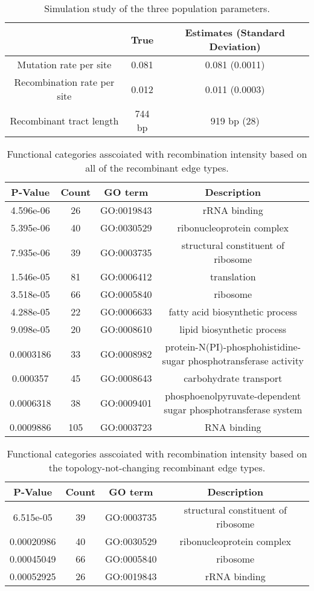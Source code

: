 \documentclass[english]{article}
\providecommand{\tabularnewline}{\\}
\begin{document}
\begin{table}
\caption{\label{tab:sim-three-population-parameters}
Simulation study of the three population parameters.}
\noindent \begin{centering}
\begin{tabular}{ccc}
 & True & Estimates (Standard Deviation)\tabularnewline
\hline
Mutation rate per site & 0.081 & 0.081 (0.0011)\tabularnewline
Recombination rate per site & 0.012 & 0.011 (0.0003)\tabularnewline
Recombinant tract length & 744 bp & 919 bp (28)\tabularnewline
\hline
\end{tabular}
\par\end{centering}
\end{table}
\clearpage{}

\begin{table}
\caption{\label{tab:functional-all}Functional categories asscoiated with 
recombination intensity based on all of the recombinant edge types.}
\begin{tabular}{cccc}
\hline 
P-Value & Count & GO term & Description\tabularnewline
\hline 
4.596e-06 & 26 & GO:0019843 & rRNA binding\tabularnewline
5.395e-06 & 40 & GO:0030529 & ribonucleoprotein complex\tabularnewline
7.935e-06 & 39 & GO:0003735 & structural constituent of ribosome\tabularnewline
1.546e-05 & 81 & GO:0006412 & translation\tabularnewline
3.518e-05 & 66 & GO:0005840 & ribosome\tabularnewline
4.288e-05 & 22 & GO:0006633 & fatty acid biosynthetic process\tabularnewline
9.098e-05 & 20 & GO:0008610 & lipid biosynthetic process\tabularnewline
0.0003186 & 33 & GO:0008982 & protein-N(PI)-phosphohistidine-sugar phosphotransferase activity\tabularnewline
0.000357 & 45 & GO:0008643 & carbohydrate transport\tabularnewline
0.0006318 & 38 & GO:0009401 & phosphoenolpyruvate-dependent sugar phosphotransferase system\tabularnewline
0.0009886 & 105 & GO:0003723 & RNA binding\tabularnewline
\hline 
\end{tabular}
\end{table}
\clearpage{}

%
\begin{table}
\caption{\label{tab:functional-notopology}Functional categories asscoiated with 
recombination intensity based on the topology-not-changing recombinant edge types.}
\begin{tabular}{cccc}
\hline 
P-Value & Count & GO term & Description\tabularnewline
\hline 
6.515e-05 & 39 & GO:0003735 & structural constituent of ribosome\tabularnewline
0.00020986 & 40 & GO:0030529 & ribonucleoprotein complex\tabularnewline
0.00045049 & 66 & GO:0005840 & ribosome\tabularnewline
0.00052925 & 26 & GO:0019843 & rRNA binding\tabularnewline
\hline 
\end{tabular}
\end{table}
\clearpage{}
\end{document}
